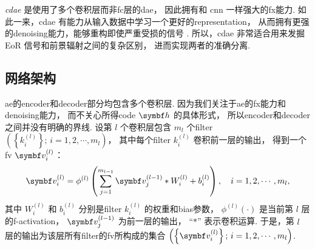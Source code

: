 \emph{\ac{cdae}} 是使用了多个卷积层而非\ac{fc}层的\ac{dae}，
因此拥有和 \ac{cnn} 一样强大的\ac{fx}能力.
如此一来，\ac{cdae} 有能力从输入数据中学习一个更好的\ac{representation}，
从而拥有更强的\ac{denoising}能力，能够重构即使严重受损的信号 \cite{du2017}.
所以，\ac{cdae} 非常适合用来发掘 EoR 信号和前景辐射之间的复杂区别，
进而实现两者的准确分离.

\subsection{网络架构}
\label{sec:architecture}

\begin{figure}[htp]
  \centering
\end{figure}

\ac{ae}的\ac{encoder}和\ac{decoder}部分均包含多个卷积层.
因为我们关注于\ac{ae}的\ac{fx}能力和\ac{denoising}能力，
而不关心所得\ac{code} $\B{h}$ 的具体形式，
所以\ac{encoder}和\ac{decoder}之间并没有明确的界线.
设第 $l$ 个卷积层包含 $m_l$ 个\ac{filter}
$\left(\left\{ k_{i}^{(l)} \right\};\, i = 1, 2, \cdots, m_l \right)$，
其中每个\ac{filter} $k_{i}^{(l)}$ 卷积前一层的输出，
得到一个\ac{fv} $\B{v}_{i}^{(l)}$：
\begin{equation}
  \label{eq:conv}
  \B{v}_{i}^{(l)} = \phi^{(l)} \left( \sum_{j=1}^{m_{l-1}}
    \B{v}_{j}^{(l-1)} * W_i^{(l)} + b_i^{(l)} \right) ,
    \quad i = 1, 2, \cdots, m_{l} ,
\end{equation}
其中
$W_i^{(l)}$ 和 $b_i^{(l)}$ 分别是\ac{filter} $k_{i}^{(l)}$
的权重和\ac{bias}参数，
$\phi^{(l)}(\cdot)$ 是当前第 $l$ 层的\ac{f-activation}，
$\B{v}_{j}^{(l-1)}$ 为前一层的输出，
\enquote{$*$} 表示卷积运算.
于是，第 $l$ 层的输出为该层所有\ac{filter}的\ac{fv}所构成的集合
$\left(\left\{ \B{v}_{i}^{(l)} \right\};\, i = 1, 2, \cdots, m_l \right)$.

